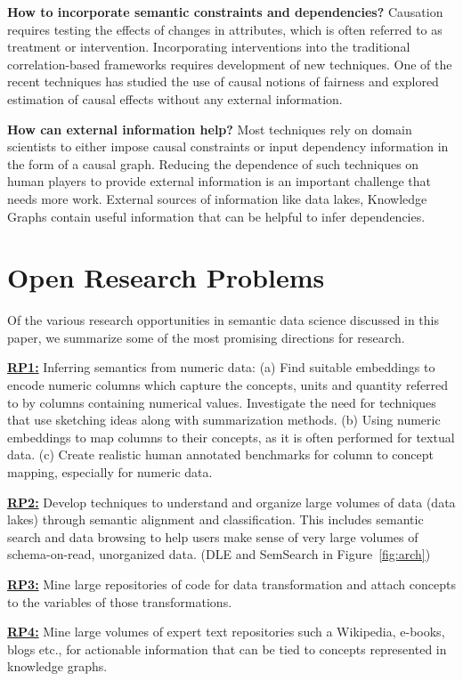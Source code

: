 \documentclass[sigconf, nonacm]{acmart}
\newcommand{\topic}[1]{\noindent \underline{ \bf #1}}
\begin{document}
\noindent \textbf{How to incorporate semantic constraints and dependencies?}
Causation requires testing the effects of changes in attributes, which is often referred to as treatment or intervention. Incorporating interventions into the traditional correlation-based frameworks requires development of new techniques. One of the recent techniques has studied the use of causal notions of fairness and explored estimation of causal effects without any external information.

\noindent \textbf{How can external information help?}
Most techniques rely on domain scientists to either impose causal constraints or input dependency information in the form of a causal graph. Reducing the dependence of such techniques on human players to provide external information is an important challenge that needs more work. External sources of information like data lakes, Knowledge Graphs contain useful information that can be helpful to infer dependencies. 

\section{Open Research Problems}
Of the various research opportunities in semantic data science discussed in this paper, we summarize some of the most promising directions for research.


\topic{RP1:} Inferring semantics from numeric data: (a) Find suitable embeddings to encode numeric columns which capture the concepts, units and quantity referred to by columns containing numerical values. Investigate the need for techniques that use sketching ideas along with summarization methods.
(b) Using numeric embeddings to map columns to their concepts, as it is often performed for textual data.
(c) Create realistic human annotated benchmarks for column to concept mapping, especially for numeric data.
 
\topic{RP2:} Develop techniques to understand and organize large volumes of data (data lakes) through semantic alignment and classification. This includes semantic search and data browsing to help users make sense of very large volumes of schema-on-read, unorganized data. (DLE and SemSearch in Figure~\ref{fig:arch})

\topic{RP3:} Mine large repositories of code for data transformation and attach concepts to the variables of those transformations. 

\topic{RP4:} Mine large volumes of expert text repositories such a Wikipedia, e-books, blogs etc., for actionable information that can be tied to concepts represented in knowledge graphs.
\end{document}
